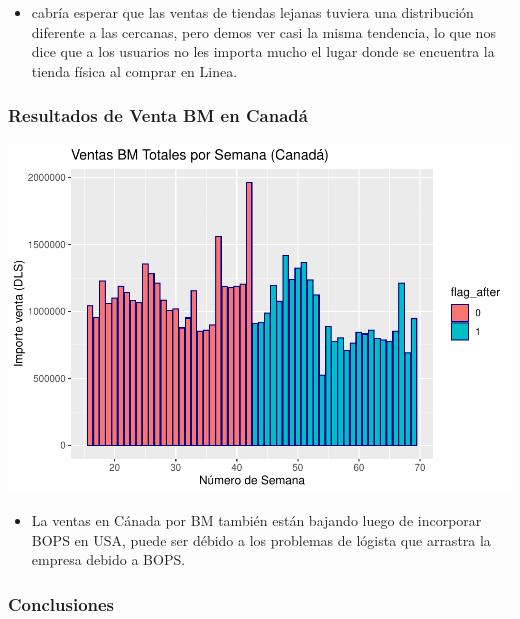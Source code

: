 \documentclass[
  landscape]{article}
\providecommand{\tightlist}{%
  \setlength{\itemsep}{0pt}\setlength{\parskip}{0pt}}
\begin{document}
\begin{itemize}
\tightlist
\item
  cabría esperar que las ventas de tiendas lejanas tuviera una
  distribución diferente a las cercanas, pero demos ver casi la misma
  tendencia, lo que nos dice que a los usuarios no les importa mucho el
  lugar donde se encuentra la tienda física al comprar en Linea.
\end{itemize}

\hypertarget{resultados-de-venta-bm-en-canaduxe1}{%
\subsubsection{Resultados de Venta BM en
Canadá}\label{resultados-de-venta-bm-en-canaduxe1}}

\includegraphics{R_BOPS_files/figure-latex/venta_BM_canada-1.pdf}

\begin{itemize}
\tightlist
\item
  La ventas en Cánada por BM también están bajando luego de incorporar
  BOPS en USA, puede ser débido a los problemas de lógista que arrastra
  la empresa debido a BOPS.
\end{itemize}

\hypertarget{conclusiones}{%
\subsubsection{Conclusiones}\label{conclusiones}}
\end{document}
